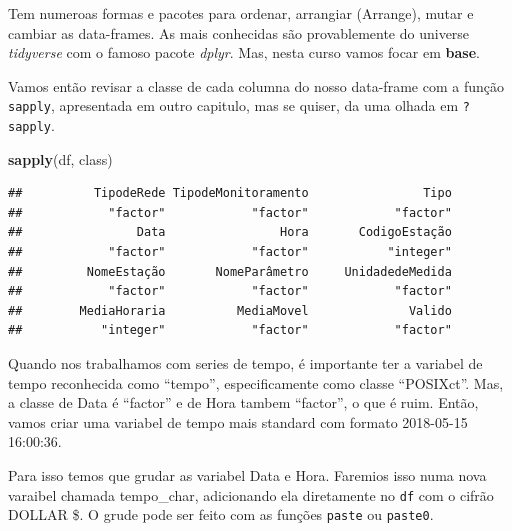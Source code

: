 \documentclass[]{book}
\newenvironment{Shaded}{\begin{snugshade}}{\end{snugshade}}
\newcommand{\KeywordTok}[1]{\textcolor[rgb]{0.13,0.29,0.53}{\textbf{#1}}}
\newcommand{\StringTok}[1]{\textcolor[rgb]{0.31,0.60,0.02}{#1}}
\newcommand{\OperatorTok}[1]{\textcolor[rgb]{0.81,0.36,0.00}{\textbf{#1}}}
\newcommand{\NormalTok}[1]{#1}
\begin{document}
Tem numeroas formas e pacotes para ordenar, arrangiar (Arrange), mutar e
cambiar as data-frames. As mais conhecidas são provablemente do universe
\emph{tidyverse} com o famoso pacote \emph{dplyr}. Mas, nesta curso
vamos focar em \textbf{base}.

Vamos então revisar a classe de cada columna do nosso data-frame com a
função \texttt{sapply}, apresentada em outro capitulo, mas se quiser, da
uma olhada em \texttt{?sapply}.

\begin{Shaded}
\begin{Highlighting}[]
\KeywordTok{sapply}\NormalTok{(df, class)}
\end{Highlighting}
\end{Shaded}

\begin{verbatim}
##          TipodeRede TipodeMonitoramento                Tipo 
##            "factor"            "factor"            "factor" 
##                Data                Hora       CodigoEstação 
##            "factor"            "factor"           "integer" 
##         NomeEstação       NomeParâmetro     UnidadedeMedida 
##            "factor"            "factor"            "factor" 
##        MediaHoraria          MediaMovel              Valido 
##           "integer"            "factor"            "factor"
\end{verbatim}

Quando nos trabalhamos com series de tempo, é importante ter a variabel
de tempo reconhecida como ``tempo'', especificamente como classe
``POSIXct''. Mas, a classe de Data é ``factor'' e de Hora tambem
``factor'', o que é ruim. Então, vamos criar uma variabel de tempo mais
standard com formato 2018-05-15 16:00:36.

Para isso temos que grudar as variabel Data e Hora. Faremios isso numa
nova varaibel chamada tempo\_char, adicionando ela diretamente no
\texttt{df} com o cifrão DOLLAR \$. O grude pode ser feito com as
funções \texttt{paste} ou \texttt{paste0}.

\begin{Shaded}
\end{Shaded}
\end{document}
